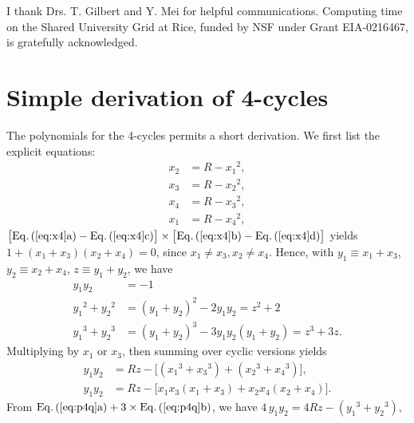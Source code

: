 \documentclass[twocolumn]{revtex4-1}
\begin{document}
I thank Drs. T. Gilbert and Y. Mei for helpful communications.
Computing time on the Shared University Grid at Rice,
funded by NSF under Grant EIA-0216467, is gratefully acknowledged.


\appendix



\section{\label{apd:per4}Simple derivation of 4-cycles}



The polynomials for the 4-cycles permits a short derivation.
We first list the explicit equations:
%
%
%
\begin{subequations}
\label{eq:x4}
\begin{align}
  x_2 &= R - {x_1}^2, \\
  x_3 &= R - {x_2}^2, \\
  x_4 &= R - {x_3}^2, \\
  x_1 &= R - {x_4}^2,
\end{align}
\end{subequations}
%
$\big[\mathrm{\refeqsub{x4}{a}} - \mathrm{\refeqsub{x4}{c}}\big]
\times
\big[\mathrm{\refeqsub{x4}{b}} - \mathrm{\refeqsub{x4}{d}}\big]$
yields $1 + (x_1 + x_3) (x_2 + x_4) = 0$,
since $x_1 \ne x_3, x_2 \ne x_4$.
%
Hence, with
$y_1 \equiv x_1 + x_3$, $y_2 \equiv x_2 + x_4$,
$z \equiv y_1 + y_2$,
we have
%
%
%
\begin{subequations}
\begin{align}
y_1 y_2       &= -1 \\
{y_1}^2 + {y_2}^2 & = (y_1 + y_2)^2 - 2 y_1 y_2 = z^2 + 2 \\
{y_1}^3 + {y_2}^3 & = (y_1 + y_2)^3 - 3 y_1 y_2 (y_1 + y_2) = z^3 + 3 z.
\end{align}
\label{eq:ypow4}
\end{subequations}
%
%
Multiplying  by $x_1$ or $x_3$,
then summing over cyclic versions yields
\begin{subequations}
\begin{align}
y_1 y_2 &= R z - \big[({x_1}^3 + {x_3}^3) + ({x_2}^3 + {x_4}^3)\big],\\
y_1 y_2 &= R z - \big[x_1 x_3 (x_1 + x_3) + x_2 x_4 (x_2 + x_4)\big].
\end{align}
\label{eq:p4q}
\end{subequations}
%
From
$\mathrm{\refeqsub{p4q}{a}} + 3 \times \mathrm{\refeqsub{p4q}{b}}$,
we have
$4 \, y_1 y_2 = 4 R z - ({y_1}^3 + {y_2}^3)$,
\end{document}
